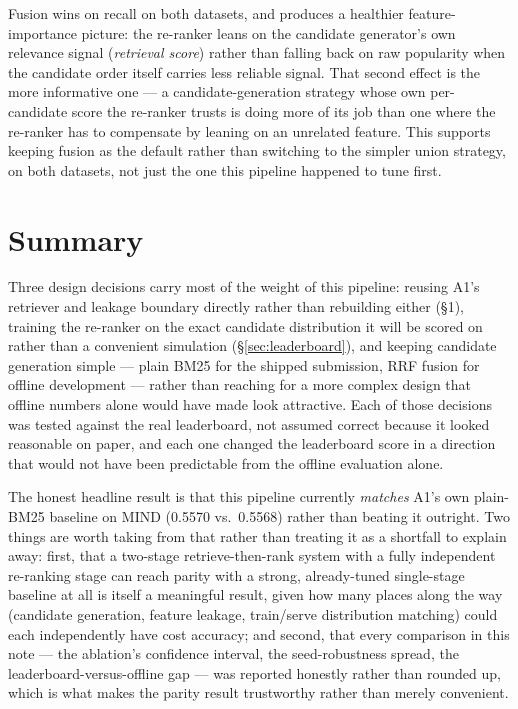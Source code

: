 \documentclass[11pt,a4paper]{article}
\begin{document}
Fusion wins on recall on both datasets, and produces a healthier feature-importance picture: the
re-ranker leans on the candidate generator's own relevance signal (\emph{retrieval score}) rather
than falling back on raw popularity when the candidate order itself carries less reliable signal.
That second effect is the more informative one --- a candidate-generation strategy whose own
per-candidate score the re-ranker trusts is doing more of its job than one where the re-ranker has
to compensate by leaning on an unrelated feature. This supports keeping fusion as the default
rather than switching to the simpler union strategy, on both datasets, not just the one this
pipeline happened to tune first.

\section{Summary}

Three design decisions carry most of the weight of this pipeline: reusing A1's retriever and
leakage boundary directly rather than rebuilding either (\S1), training the re-ranker on the exact
candidate distribution it will be scored on rather than a convenient simulation (\S\ref{sec:leaderboard}),
and keeping candidate generation simple --- plain BM25 for the shipped submission, RRF fusion for
offline development --- rather than reaching for a more complex design that offline numbers alone
would have made look attractive. Each of those decisions was tested against the real leaderboard,
not assumed correct because it looked reasonable on paper, and each one changed the leaderboard
score in a direction that would not have been predictable from the offline evaluation alone.

The honest headline result is that this pipeline currently \emph{matches} A1's own plain-BM25
baseline on MIND (0.5570 vs.\ 0.5568) rather than beating it outright. Two things are worth taking
from that rather than treating it as a shortfall to explain away: first, that a two-stage
retrieve-then-rank system with a fully independent re-ranking stage can reach parity with a
strong, already-tuned single-stage baseline at all is itself a meaningful result, given how many
places along the way (candidate generation, feature leakage, train/serve distribution matching)
could each independently have cost accuracy; and second, that every comparison in this note ---
the ablation's confidence interval, the seed-robustness spread, the leaderboard-versus-offline
gap --- was reported honestly rather than rounded up, which is what makes the parity result
trustworthy rather than merely convenient.
\end{document}
